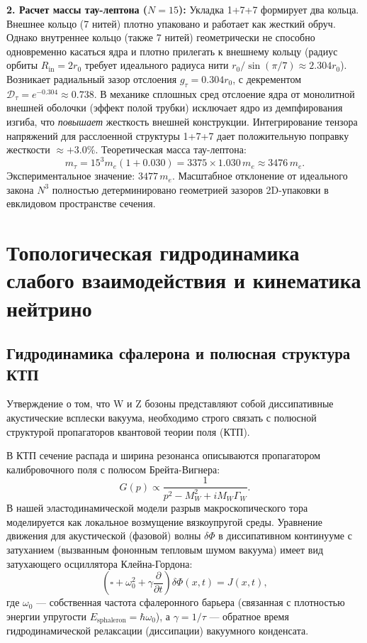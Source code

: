\documentclass[12pt,a4paper]{article}
\begin{document}
\textbf{2. Расчет массы тау-лептона ($N=15$):}
Укладка 1+7+7 формирует два кольца. Внешнее кольцо (7 нитей) плотно упаковано и работает как жесткий обруч. Однако внутреннее кольцо (также 7 нитей) геометрически не способно одновременно касаться ядра и плотно прилегать к внешнему кольцу (радиус орбиты $R_{\text{in}} = 2r_0$ требует идеального радиуса нити $r_0 / \sin(\pi/7) \approx 2.304 r_0$). Возникает радиальный зазор отслоения $g_\tau = 0.304 r_0$, с декрементом $\mathcal{D}_\tau = e^{-0.304} \approx 0.738$.
В механике сплошных сред отслоение ядра от монолитной внешней оболочки (эффект полой трубки) исключает ядро из демпфирования изгиба, что \textit{повышает} жесткость внешней конструкции. Интегрирование тензора напряжений для расслоенной структуры 1+7+7 дает положительную поправку жесткости $\approx +3.0\%$.
Теоретическая масса тау-лептона:
\begin{equation}
m_\tau = 15^3 m_e (1 + 0.030) = 3375 \times 1.030 \, m_e \approx 3476 \, m_e.
\end{equation}
Экспериментальное значение: $3477 \, m_e$. 
Масштабное отклонение от идеального закона $N^3$ полностью детерминировано геометрией зазоров 2D-упаковки в евклидовом пространстве сечения.
		
\section{Топологическая гидродинамика слабого взаимодействия и кинематика нейтрино}
	
\subsection{Гидродинамика сфалерона и полюсная структура КТП}
Утверждение о том, что W и Z бозоны представляют собой диссипативные акустические всплески вакуума, необходимо строго связать с полюсной структурой пропагаторов квантовой теории поля (КТП).

В КТП сечение распада и ширина резонанса описываются пропагатором калибровочного поля с полюсом Брейта-Вигнера:
\begin{equation}
G(p) \propto \frac{1}{p^2 - M_W^2 + i M_W \Gamma_W}.
\end{equation}
В нашей эластодинамической модели разрыв макроскопического тора моделируется как локальное возмущение вязкоупругой среды. Уравнение движения для акустической (фазовой) волны $\delta \Phi$ в диссипативном континууме с затуханием (вызванным фононным тепловым шумом вакуума) имеет вид затухающего осциллятора Клейна-Гордона:
\begin{equation}
\left( \square + \omega_0^2 + \gamma \frac{\partial}{\partial t} \right) \delta \Phi(x,t) = J(x,t),
\end{equation}
где $\omega_0$ — собственная частота сфалеронного барьера (связанная с плотностью энергии упругости $E_{\text{sphaleron}} = \hbar \omega_0$), а $\gamma = 1/\tau$ — обратное время гидродинамической релаксации (диссипации) вакуумного конденсата.
\end{document}
